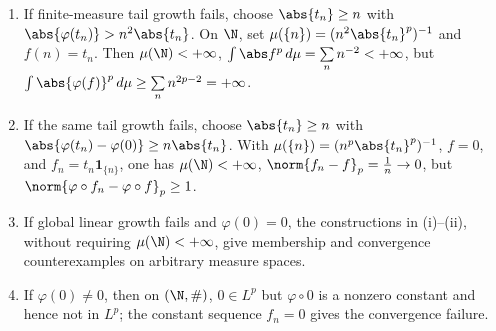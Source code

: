 \begin{method} \label{meth:composition-growth-counterexamples} 
\begin{enumerate}[label=(\roman*)]
\setlength{\itemsep}{0pt}
\item If finite-measure tail growth fails, choose $\abs{t_n}\geq n$ with $\abs{\varphi(t_n)}>n^2\abs{t_n}$. On $\N$, set $\mu(\{n\})=(n^2\abs{t_n}^p)^{-1}$ and $f(n)=t_n$. Then $\mu(\N)<+\infty$, $\int\abs f^p\,d\mu=\sum\limits_n n^{-2}<+\infty$, but $\int\abs{\varphi(f)}^p\,d\mu\geq\sum\limits_n n^{2p-2}=+\infty$.
\item If the same tail growth fails, choose $\abs{t_n}\geq n$ with $\abs{\varphi(t_n)-\varphi(0)}\geq n\abs{t_n}$. With $\mu(\{n\})=(n^p\abs{t_n}^p)^{-1}$, $f=0$, and $f_n=t_n\mathbf{1}_{\{n\}}$, one has $\mu(\N)<+\infty$, $\norm{f_n-f}_p=\frac{1}{n}\to0$, but $\norm{\varphi\circ f_n-\varphi\circ f}_p\geq1$.
\item If global linear growth fails and $\varphi(0)=0$, the constructions in (i)--(ii), without requiring $\mu(\N)<+\infty$, give membership and convergence counterexamples on arbitrary measure spaces.
\item If $\varphi(0)\neq0$, then on $(\N,\#)$, $0\in L^p$ but $\varphi\circ0$ is a nonzero constant and hence not in $L^p$; the constant sequence $f_n=0$ gives the convergence failure.
\end{enumerate}
\end{method}
